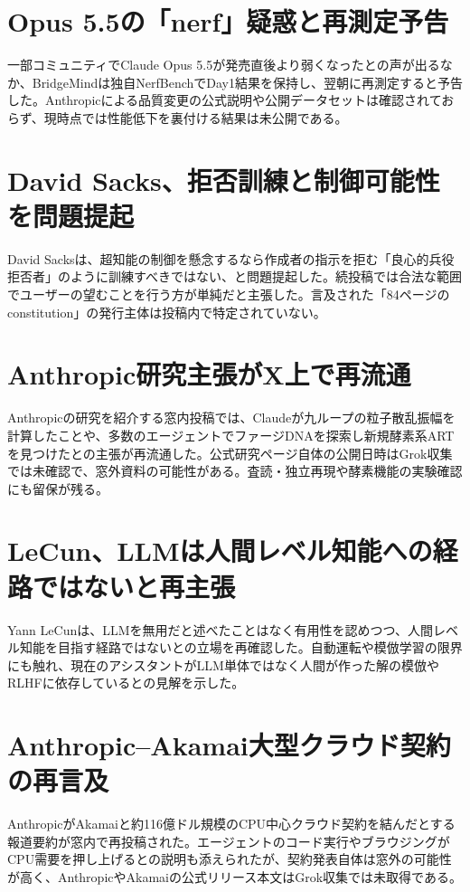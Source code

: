 \section{Opus 5.5の「nerf」疑惑と再測定予告}
一部コミュニティでClaude Opus 5.5が発売直後より弱くなったとの声が出るなか、BridgeMindは独自NerfBenchでDay1結果を保持し、翌朝に再測定すると予告した。Anthropicによる品質変更の公式説明や公開データセットは確認されておらず、現時点では性能低下を裏付ける結果は未公開である。

\section{David Sacks、拒否訓練と制御可能性を問題提起}
David Sacksは、超知能の制御を懸念するなら作成者の指示を拒む「良心的兵役拒否者」のように訓練すべきではない、と問題提起した。続投稿では合法な範囲でユーザーの望むことを行う方が単純だと主張した。言及された「84ページのconstitution」の発行主体は投稿内で特定されていない。

\section{Anthropic研究主張がX上で再流通}
Anthropicの研究を紹介する窓内投稿では、Claudeが九ループの粒子散乱振幅を計算したことや、多数のエージェントでファージDNAを探索し新規酵素系ARTを見つけたとの主張が再流通した。公式研究ページ自体の公開日時はGrok収集では未確認で、窓外資料の可能性がある。査読・独立再現や酵素機能の実験確認にも留保が残る。

\section{LeCun、LLMは人間レベル知能への経路ではないと再主張}
Yann LeCunは、LLMを無用だと述べたことはなく有用性を認めつつ、人間レベル知能を目指す経路ではないとの立場を再確認した。自動運転や模倣学習の限界にも触れ、現在のアシスタントがLLM単体ではなく人間が作った解の模倣やRLHFに依存しているとの見解を示した。

\section{Anthropic--Akamai大型クラウド契約の再言及}
AnthropicがAkamaiと約116億ドル規模のCPU中心クラウド契約を結んだとする報道要約が窓内で再投稿された。エージェントのコード実行やブラウジングがCPU需要を押し上げるとの説明も添えられたが、契約発表自体は窓外の可能性が高く、AnthropicやAkamaiの公式リリース本文はGrok収集では未取得である。

